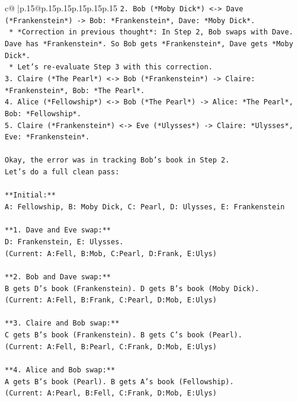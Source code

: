 \documentclass{article}
\begin{document}
{\begin{supertabular}{c@{$\;$}|p{.15\linewidth}@{}p{.15\linewidth}p{.15\linewidth}p{.15\linewidth}p{.15\linewidth}p{.15\linewidth}}
{{{\texttt{2.  Bob (*Moby Dick*) <{-}> Dave (*Frankenstein*) {-}> Bob: *Frankenstein*, Dave: *Moby Dick*.} \\
\texttt{    *   *Correction in previous thought*: In Step 2, Bob swaps with Dave. Dave has *Frankenstein*. So Bob gets *Frankenstein*, Dave gets *Moby Dick*.} \\
\texttt{    *   Let's re{-}evaluate Step 3 with this correction.} \\
\texttt{3.  Claire (*The Pearl*) <{-}> Bob (*Frankenstein*) {-}> Claire: *Frankenstein*, Bob: *The Pearl*.} \\
\texttt{4.  Alice (*Fellowship*) <{-}> Bob (*The Pearl*) {-}> Alice: *The Pearl*, Bob: *Fellowship*.} \\
\texttt{5.  Claire (*Frankenstein*) <{-}> Eve (*Ulysses*) {-}> Claire: *Ulysses*, Eve: *Frankenstein*.} \\
\\ 
\texttt{Okay, the error was in tracking Bob's book in Step 2.} \\
\texttt{Let's do a full clean pass:} \\
\\ 
\texttt{**Initial:**} \\
\texttt{A: Fellowship, B: Moby Dick, C: Pearl, D: Ulysses, E: Frankenstein} \\
\\ 
\texttt{**1. Dave and Eve swap:**} \\
\texttt{D: Frankenstein, E: Ulysses.} \\
\texttt{(Current: A:Fell, B:Mob, C:Pearl, D:Frank, E:Ulys)} \\
\\ 
\texttt{**2. Bob and Dave swap:**} \\
\texttt{B gets D's book (Frankenstein). D gets B's book (Moby Dick).} \\
\texttt{(Current: A:Fell, B:Frank, C:Pearl, D:Mob, E:Ulys)} \\
\\ 
\texttt{**3. Claire and Bob swap:**} \\
\texttt{C gets B's book (Frankenstein). B gets C's book (Pearl).} \\
\texttt{(Current: A:Fell, B:Pearl, C:Frank, D:Mob, E:Ulys)} \\
\\ 
\texttt{**4. Alice and Bob swap:**} \\
\texttt{A gets B's book (Pearl). B gets A's book (Fellowship).} \\
\texttt{(Current: A:Pearl, B:Fell, C:Frank, D:Mob, E:Ulys)} \\
}}}
\end{supertabular}}
\end{document}
